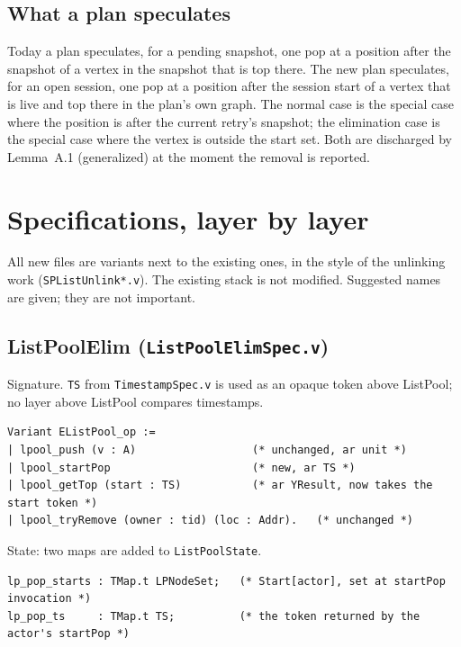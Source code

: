 \documentclass[11pt]{article}
\theoremstyle{definition}
\theoremstyle{remark}
\newcommand{\code}[1]{\texttt{#1}}
\newcommand{\file}[1]{\texttt{#1}}
\begin{document}
\subsection{What a plan speculates}

Today a plan speculates, for a pending snapshot, one pop at a position
after the snapshot of a vertex in the snapshot that is top there. The new
plan speculates, for an open session, one pop at a position after the
session start of a vertex that is live and top there in the plan's own
graph. The normal case is the special case where the position is after
the current retry's snapshot; the elimination case is the special case
where the vertex is outside the start set. Both are discharged by
Lemma~A.1 (generalized) at the moment the removal is reported.

\section{Specifications, layer by layer}
\label{sec:specs}

All new files are variants next to the existing ones, in the style of
the unlinking work (\file{SPListUnlink*.v}). The existing stack is not
modified. Suggested names are given; they are not important.

\subsection{ListPoolElim (\file{ListPoolElimSpec.v})}

Signature. \code{TS} from \file{TimestampSpec.v} is used as an opaque
token above ListPool; no layer above ListPool compares timestamps.

\begin{lstlisting}
Variant EListPool_op :=
| lpool_push (v : A)                  (* unchanged, ar unit *)
| lpool_startPop                      (* new, ar TS *)
| lpool_getTop (start : TS)           (* ar YResult, now takes the start token *)
| lpool_tryRemove (owner : tid) (loc : Addr).   (* unchanged *)
\end{lstlisting}

State: two maps are added to \code{ListPoolState}.

\begin{lstlisting}
lp_pop_starts : TMap.t LPNodeSet;   (* Start[actor], set at startPop invocation *)
lp_pop_ts     : TMap.t TS;          (* the token returned by the actor's startPop *)
\end{lstlisting}
\end{document}
